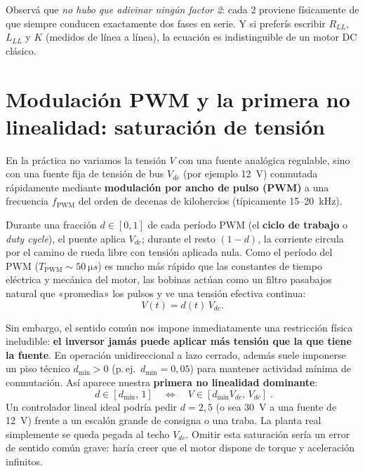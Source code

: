 \documentclass[11pt,a4paper,oneside]{book}
\begin{document}
Observá que \emph{no hubo que adivinar ningún factor 2}: cada 2 proviene
físicamente de que siempre conducen exactamente dos fases en serie. Y si
preferís escribir $R_{LL}$, $L_{LL}$ y $K$ (medidos de línea a línea), la
ecuación es indistinguible de un motor DC clásico.

\section{Modulación PWM y la primera no linealidad: saturación de tensión}

En la práctica no variamos la tensión $V$ con una fuente analógica regulable,
sino con una fuente fija de tensión de bus $V_{dc}$ (por ejemplo \SI{12}{V})
conmutada rápidamente mediante \textbf{modulación por ancho de pulso (PWM)} a
una frecuencia $f_{\text{PWM}}$ del orden de decenas de kilohercios (típicamente
15--\SI{20}{kHz}).

Durante una fracción $d \in [0, 1]$ de cada período PWM (el \textbf{ciclo de
trabajo} o \emph{duty cycle}), el puente aplica $V_{dc}$; durante el resto
$(1-d)$, la corriente circula por el camino de rueda libre con tensión aplicada
nula. Como el período del PWM ($T_{\text{PWM}} \sim \SI{50}{\micro s}$) es mucho
más rápido que las constantes de tiempo eléctrica y mecánica del motor, las
bobinas actúan como un filtro pasabajos natural que «promedia» los pulsos y ve
una tensión efectiva continua:
\begin{equation}
  V(t) = d(t)\,V_{dc}.
  \label{eq:pwm_avg}
\end{equation}

Sin embargo, el sentido común nos impone inmediatamente una restricción física
ineludible: \textbf{el inversor jamás puede aplicar más tensión que la que tiene
la fuente}. En operación unidireccional a lazo cerrado, además suele imponerse un
piso técnico $d_{\min} > 0$ (p.\,ej.\ $d_{\min} = 0{,}05$) para mantener
actividad mínima de conmutación. Así aparece nuestra \textbf{primera no
linealidad dominante}:
\begin{equation}
  \boxed{\;d \in [d_{\min},\, 1] \quad\Longleftrightarrow\quad V \in [d_{\min}V_{dc},\, V_{dc}]\;.}
  \label{eq:sat_tension}
\end{equation}
Un controlador lineal ideal podría pedir $d = 2{,}5$ (o sea \SI{30}{V} a una
fuente de \SI{12}{V}) frente a un escalón grande de consigna o una traba. La
planta real simplemente se queda pegada al techo $V_{dc}$. Omitir esta
saturación sería un error de sentido común grave: haría creer que el motor
dispone de torque y aceleración infinitos.
\end{document}
